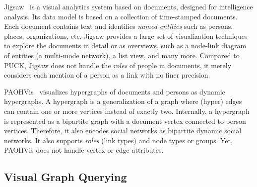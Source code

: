 Jigsaw~\cite{DBLP:journals/ivs/GorgLS14} is a visual analytics system based on documents, designed for intelligence analysis. Its data model is based on a collection of time-stamped documents. Each document contains text and identifies \emph{named entities} such as persons, places, organizations, etc. Jigsaw provides a large set of visualization techniques to explore the documents in detail or as overviews, such as a node-link diagram of entities (a multi-mode network), a list view, and many more. Compared to PUCK, Jigsaw does not handle the \emph{roles} of people in documents, it merely considers each mention of a person as a link with no finer precision.

PAOHVis~\cite{valdivia:hal-02264960} visualizes hypergraphs of documents and persons as dynamic hypergraphs. A hypergraph is a generalization of a graph where (hyper) edges can contain one or more vertices instead of exactly two.
Internally, a hypergraph is represented as a bipartite graph with a document vertex connected to person vertices. Therefore, it also encodes social networks as bipartite dynamic social networks. It also supports \emph{roles} (link types) and node types or groups.
Yet, PAOHVis does not handle vertex or edge attributes.

\subsection{Visual Graph Querying}


